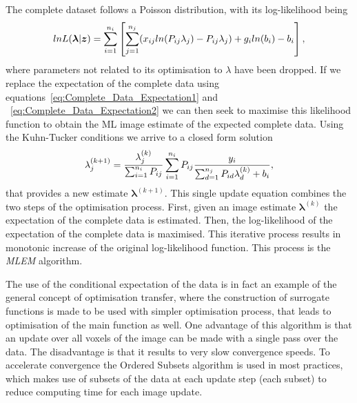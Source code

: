 The complete dataset follows a Poisson distribution, with its log-likelihood being
\begin{equation}
lnL(\bm{\lambda}|\bm{z}) = 
\sum_{i=1}^{n_i} \left[\sum_{j=1}^{n_j}( x_{ij} ln(P_{ij}\lambda_j) - P_{ij} \lambda_j) +
g_i ln(b_i) - b_i \right] \\ ,  
\label{eqn:log_likelihood_z}
\end{equation}
where parameters not related to its optimisation to $\lambda$ have been dropped. 
If we replace the expectation of the complete data using equations~\ref{eq:Complete_Data_Expectation1} and ~\ref{eq:Complete_Data_Expectation2} we can then seek to maximise this likelihood function to obtain the ML image estimate of the expected complete data. Using the Kuhn-Tucker conditions we arrive to a closed form solution
\begin{equation}
\lambda_j^{(k+1)} = \frac{\lambda_j^{(k)}}{\sum_{i=1}^{n_i} P_{ij}} 
\sum_{i=1}^{n_i} P_{ij} 
\frac{y_i}{\sum_{d=1}^{n_j} P_{id}\lambda_d^{(k)} + b_i } \\,
\label{eqn:MLEM}
\end{equation} 
that provides a new estimate $\bm{\lambda}^{(k+1)}$. This single update equation combines the two steps of the optimisation process. First, given an image estimate $\bm{\lambda}^{(k)}$ the expectation of the complete data is estimated. Then, the log-likelihood of the expectation of the complete data is maximised. This iterative process results in monotonic increase of the original log-likelihood function. This process is the \textit{MLEM} algorithm.

The use of the conditional expectation of the data is in fact an example of the general concept of optimisation transfer, where the construction of surrogate functions is made to be used with simpler optimisation process, that leads to optimisation of the main function as well. One advantage of this algorithm is that an update over all voxels of the image can be made with a single pass over the data. The disadvantage is that it results to very slow convergence speeds. 
To accelerate convergence the Ordered Subsets algorithm is used in most practices, which makes use of subsets of the data at each update step (each subset) to reduce computing time for each image update. 

